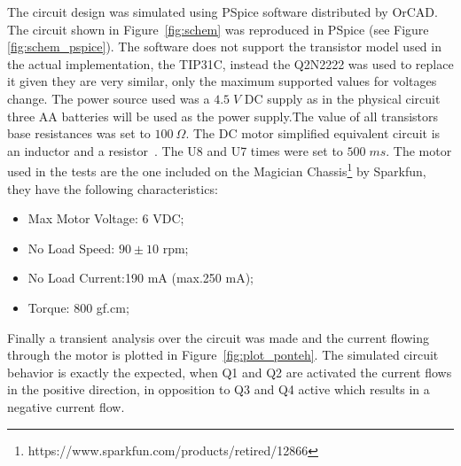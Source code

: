     The circuit design was simulated using PSpice software distributed by OrCAD. The circuit shown in Figure~\ref{fig:schem} was reproduced in PSpice (see Figure \ref{fig:schem_pspice}). The software does not support the transistor model used in the actual implementation, the TIP31C, instead the Q2N2222 was used to replace it given they are very similar, only the maximum supported values for voltages change. The power source used was a $4.5\;V$ DC supply as in the physical circuit three AA batteries will be used as the power supply.The value of all transistors base resistances was set to $100\:\Omega$. The DC motor simplified equivalent circuit is an inductor and a resistor~\cite{CHAPMAN}. The U8 and U7 times were set to $500\; ms$.\newline
    The motor used in the tests are the one included on the Magician Chassis\footnote{https://www.sparkfun.com/products/retired/12866} by Sparkfun, they have the following characteristics:
    \begin{itemize}
        \item Max Motor Voltage: 6 VDC;
        \item No Load Speed: $90\pm10$ rpm;
        \item No Load Current:190 mA (max.250 mA);
        \item Torque: 800 gf.cm;
    \end{itemize}
	Finally a transient analysis over the circuit was made and the current flowing through the motor is plotted in Figure~\ref{fig:plot_ponteh}. The simulated circuit behavior is exactly the expected, when Q1 and Q2 are activated the current flows in the positive direction, in opposition to Q3 and Q4 active which results in a negative current flow.
	


